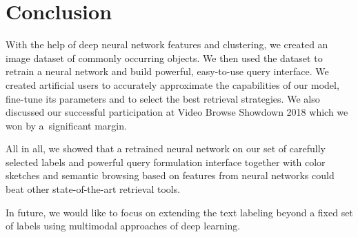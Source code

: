 \chapter*{Conclusion}

With the help of deep neural network features and clustering, we created an image dataset of commonly occurring objects. We then used the dataset to retrain a neural network and build powerful, easy-to-use query interface. We created artificial users to accurately approximate the capabilities of our model, fine-tune its parameters and to select the best retrieval strategies. We also discussed our successful participation at Video Browse Showdown 2018 which we won by a~significant margin.

All in all, we showed that a retrained neural network on our set of carefully selected labels and powerful query formulation interface together with color sketches and semantic browsing based on features from neural networks could beat other state-of-the-art retrieval tools.


In future, we would like to focus on extending the text labeling beyond a fixed set of labels using multimodal approaches of deep learning.